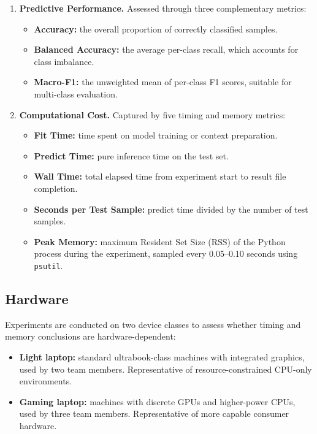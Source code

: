\documentclass{SYSUReport}
\begin{document}
\begin{enumerate}
    \item \textbf{Predictive Performance.} Assessed through three complementary metrics:
    \begin{itemize}
        \item \textbf{Accuracy:} the overall proportion of correctly classified samples.
        \item \textbf{Balanced Accuracy:} the average per-class recall, which accounts for class imbalance.
        \item \textbf{Macro-F1:} the unweighted mean of per-class F1 scores, suitable for multi-class evaluation.
    \end{itemize}

    \item \textbf{Computational Cost.} Captured by five timing and memory metrics:
    \begin{itemize}
        \item \textbf{Fit Time:} time spent on model training or context preparation.
        \item \textbf{Predict Time:} pure inference time on the test set.
        \item \textbf{Wall Time:} total elapsed time from experiment start to result file completion.
        \item \textbf{Seconds per Test Sample:} predict time divided by the number of test samples.
        \item \textbf{Peak Memory:} maximum Resident Set Size (RSS) of the Python process during the experiment, sampled every 0.05--0.10 seconds using \texttt{psutil}.
    \end{itemize}
\end{enumerate}



\subsection{Hardware}

Experiments are conducted on two device classes to assess whether timing and memory conclusions are hardware-dependent:

\begin{itemize}
    \item \textbf{Light laptop:} standard ultrabook-class machines with integrated graphics, used by two team members. Representative of resource-constrained CPU-only environments.
    \item \textbf{Gaming laptop:} machines with discrete GPUs and higher-power CPUs, used by three team members. Representative of more capable consumer hardware.
\end{itemize}
\end{document}

